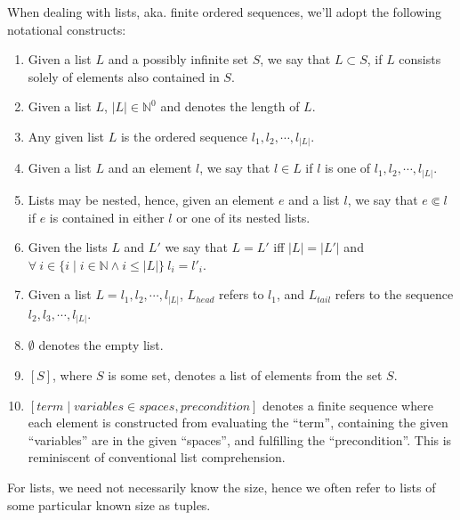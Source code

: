 \begin{definition} When dealing with lists, aka. finite ordered sequences,
we'll adopt the following notational constructs:

\begin{enumerate}

\item Given a list $L$ and a possibly infinite set $S$, we say that $L\subset
S$, if $L$ consists solely of elements also contained in $S$.

\item Given a list $L$, $|L|\in\mathbb{N}^0$ and denotes the length of $L$.

\item Any given list $L$ is the ordered sequence $l_1,l_2,\cdots,l_{|L|}$.

\item Given a list $L$ and an element $l$, we say that $l\in L$ if $l$ is one
of $l_1,l_2,\cdots,l_{|L|}$.

\item Lists may be nested, hence, given an element $e$ and a list $l$, we say
that $e\Subset l$ if $e$ is contained in either $l$ or one of its nested lists.

\item Given the lists $L$ and $L'$ we say that $L=L'$ iff $|L|=|L'|$ and
$\forall\ i\in \{i\mid i\in\mathbb{N} \wedge i \leq |L|\}\ l_i=l'_i$.

\item Given a list $L=l_1,l_2,\cdots,l_{|L|}$, $L_{head}$ refers to $l_1$, and
$L_{tail}$ refers to the sequence $l_2,l_3,\cdots,l_{|L|}$.

\item $\emptyset$ denotes the empty list.

\item $[S]$, where $S$ is some set, denotes a list of elements from the set
$S$.

\item $\left[ term \mid variables \in spaces, precondition \right]$ denotes a
finite sequence where each element is constructed from evaluating the ``term'',
containing the given ``variables'' are in the given ``spaces'', and fulfilling
the ``precondition''. This is reminiscent of conventional list comprehension.

\end{enumerate}

\end{definition}

For lists, we need not necessarily know the size, hence we often refer to lists
of some particular known size as tuples.

